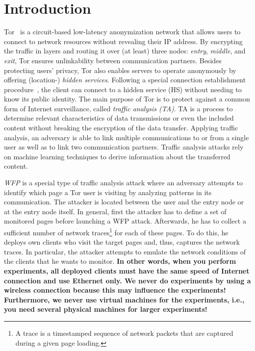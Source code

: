 \chapter{Introduction}
\label{chap:introduction}

Tor~\cite{tor_design_paper} is a circuit-based low-latency anonymization network that %
allows users to connect to network resources without revealing their \ac{IP} address. By encrypting the traffic in layers and routing it over (at least) three nodes: \emph{entry}, \emph{middle}, and \emph{exit}, Tor ensures unlinkability between communication partners. Besides protecting users’ privacy, Tor also enables servers to operate anonymously by offering (location-) \emph{hidden services}. Following a special connection establishment procedure~\cite{rendezvous_spec}, the client can connect to a hidden service (\acs{HS}) without needing to know its public identity. The main purpose of Tor is to protect against a common form of Internet surveillance, called \emph{traffic analysis (\acs{TA})}. TA is a process to determine relevant characteristics of data transmissions or even the included content without breaking the encryption of the data transfer. Applying traffic analysis, an adversary is able to link multiple communications to or from a single user as well as to link two communication partners. Traffic analysis attacks rely on machine learning techniques to derive information about the transferred content.

\emph{\ac{WFP}} is a special type of traffic analysis attack where an adversary attempts to identify which page a Tor user is visiting by analyzing patterns in its communication. The attacker is located between the user and the entry node or at the entry node itself. In general, first the attacker has to define a set of monitored pages before launching a \ac{WFP} attack. Afterwards, he has to collect a sufficient number of network traces\footnote{A trace is a timestamped sequence of network packets that are captured during a given page loading.} for each of these pages. To do this, he deploys own clients who visit the target pages and, thus, captures the network traces. In particular, the attacker attempts to emulate the network conditions of the clients that he wants to monitor. \textbf{In other words, when you perform experiments, all deployed clients must have the same speed of Internet connection and use Ethernet only. We never do experiments by using a wireless connection because this may influence the experiments! Furthermore, we never use virtual machines for the experiments, i.e., you need several physical machines for larger experiments!}

